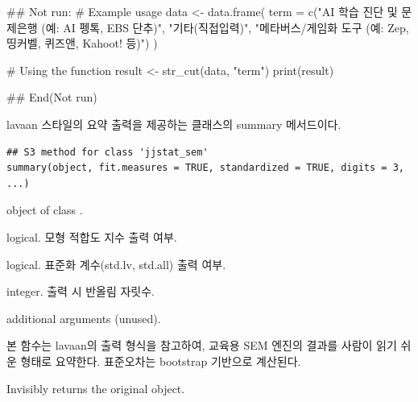 \documentclass[a4paper]{book}
\begin{document}
%
\begin{Examples}
\begin{ExampleCode}
## Not run: 
# Example usage
data <- data.frame(
  term = c("AI 학습 진단 및 문제은행 (예: AI 펭톡, EBS 단추)",
           "기타(직접입력)",
           "메타버스/게임화 도구 (예: Zep, 띵커벨, 퀴즈앤, Kahoot! 등)")
)

# Using the function
result <- str_cut(data, "term")
print(result)

## End(Not run)
\end{ExampleCode}
\end{Examples}
%
\begin{Description}
lavaan 스타일의 요약 출력을 제공하는
 클래스의 summary 메서드이다.
\end{Description}
%
\begin{Usage}
\begin{verbatim}
## S3 method for class 'jjstat_sem'
summary(object, fit.measures = TRUE, standardized = TRUE, digits = 3, ...)
\end{verbatim}
\end{Usage}
%
\begin{Arguments}
\begin{ldescription}
\item[\code{object}] object of class .

\item[\code{fit.measures}] logical.
모형 적합도 지수 출력 여부.

\item[\code{standardized}] logical.
표준화 계수(std.lv, std.all) 출력 여부.

\item[\code{digits}] integer.
출력 시 반올림 자릿수.

\item[\code{...}] additional arguments (unused).
\end{ldescription}
\end{Arguments}
%
\begin{Details}
본 함수는 lavaan의  출력 형식을 참고하여,
교육용 SEM 엔진의 결과를 사람이 읽기 쉬운 형태로 요약한다.
표준오차는 bootstrap 기반으로 계산된다.
\end{Details}
%
\begin{Value}
Invisibly returns the original  object.
\end{Value}
%
\end{document}
